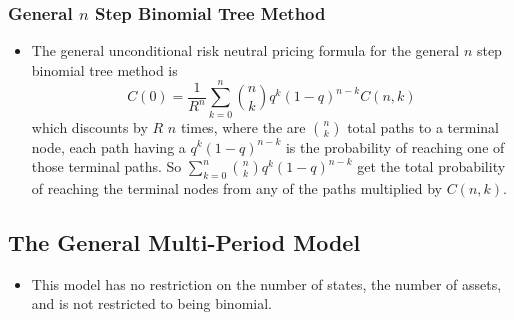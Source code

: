 \documentclass[11pt]{article}
\begin{document}
\subsubsection{General $n$ Step Binomial Tree Method}

\begin{itemize}
    \item The general unconditional risk neutral pricing formula for the general $n$ step 
    binomial tree method is 
    \[C(0) = \frac{1}{R^n}\sum_{k=0}^{n} {n \choose k} q^k {(1-q)}^{n-k} C(n,k)\]
    which discounts by $R$ $n$ times, where the are $ {n \choose k} $ total paths to a 
    terminal node, each path having a $q^k {(1-q)}^{n-k}$ is the probability of reaching one 
    of those terminal paths. So $\sum_{k=0}^{n} {n \choose k} q^k {(1-q)}^{n-k}$ get the total 
    probability of reaching the terminal nodes from any of the paths multiplied by $C(n,k)$.
\end{itemize}

\subsection{The General Multi-Period Model}
\begin{itemize}
    \item This model has no restriction on the number of states, the number of assets, and is 
    not restricted to being binomial. 
\end{itemize}
\end{document}
